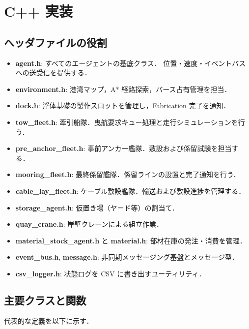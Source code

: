\documentclass[10pt,letterpaper]{jsarticle}
\begin{document}
\section{C++ 実装}
\subsection{ヘッダファイルの役割}
\begin{itemize}
  \item \textbf{agent.h}: すべてのエージェントの基底クラス．
  位置・速度・イベントバスへの送受信を提供する．
  \item \textbf{environment.h}: 港湾マップ，A* 経路探索，バース占有管理を担当．
  \item \textbf{dock.h}: 浮体基礎の製作スロットを管理し，Fabrication 完了を通知．
  \item \textbf{tow\_fleet.h}: 牽引船隊．曳航要求キュー処理と走行シミュレーションを行う．
  \item \textbf{pre\_anchor\_fleet.h}: 事前アンカー艦隊．敷設および係留試験を担当する．
  \item \textbf{mooring\_fleet.h}: 最終係留艦隊．係留ラインの設置と完了通知を行う．
  \item \textbf{cable\_lay\_fleet.h}: ケーブル敷設艦隊．輸送および敷設進捗を管理する．
  \item \textbf{storage\_agent.h}: 仮置き場（ヤード等）の割当て．
  \item \textbf{quay\_crane.h}: 岸壁クレーンによる組立作業．
  \item \textbf{material\_stock\_agent.h} と \textbf{material.h}: 部材在庫の発注・消費を管理．
  \item \textbf{event\_bus.h}, \textbf{message.h}: 非同期メッセージング基盤とメッセージ型．
  \item \textbf{csv\_logger.h}: 状態ログを CSV に書き出すユーティリティ．
\end{itemize}

\subsection{主要クラスと関数}
代表的な定義を以下に示す．
\end{document}

